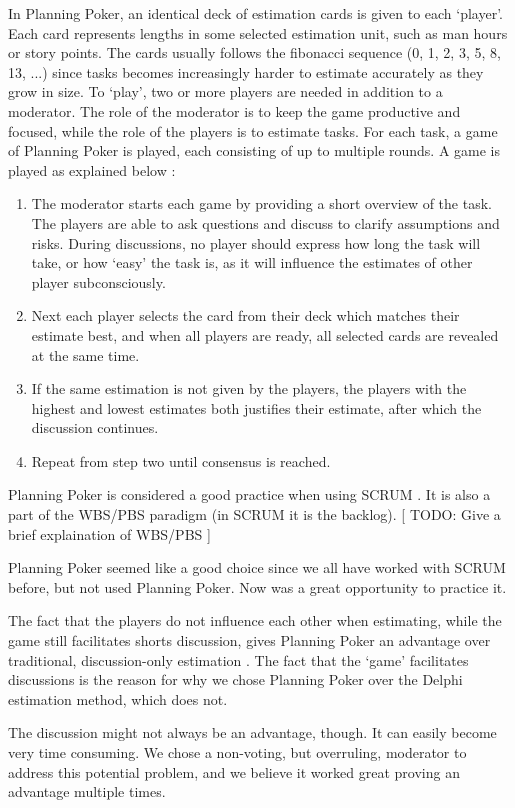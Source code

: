 In Planning Poker, an identical deck of estimation cards is given to each `player'. Each card represents lengths in some selected estimation unit, such as man hours or story points. The cards usually follows the fibonacci sequence (0, 1, 2, 3, 5, 8, 13, ...) since tasks becomes increasingly harder to estimate accurately as they grow in size.
To `play', two or more players are needed in addition to a moderator. The role of the moderator is to keep the game productive and focused, while the role of the players is to estimate tasks.
For each task, a game of Planning Poker is played, each consisting of up to multiple rounds. A game is played as explained below \cite[p. ?]{?}:
\begin{enumerate}
	\item The moderator starts each game by providing a short overview of the task. The players are able to ask questions and discuss to clarify assumptions and risks. During discussions, no player should express how long the task will take, or how `easy' the task is, as it will influence the estimates of other player subconsciously.
	\item Next each player selects the card from their deck which matches their estimate best, and when all players are ready, all selected cards are revealed at the same time.
	\item If the same estimation is not given by the players, the players with the highest and lowest estimates both justifies their estimate, after which the discussion continues.
	\item Repeat from step two until consensus is reached.
\end{enumerate}

Planning Poker is considered a good practice when using SCRUM \cite[p. ?]{?}. It is also a part of the WBS/PBS paradigm (in SCRUM it is the backlog). [ TODO: Give a brief explaination of WBS/PBS ]

Planning Poker seemed like a good choice since we all have worked with SCRUM before, but not used Planning Poker. Now was a great opportunity to practice it.

The fact that the players do not influence each other when estimating, while the game still facilitates shorts discussion, gives Planning Poker an advantage over traditional, discussion-only estimation \cite[p. ?]{?}. 
The fact that the `game' facilitates discussions is the reason for why we chose Planning Poker over the Delphi estimation method, which does not.

The discussion might not always be an advantage, though. It can easily become very time consuming. We chose a non-voting, but overruling, moderator to address this potential problem, and we believe it worked great proving an advantage multiple times.

